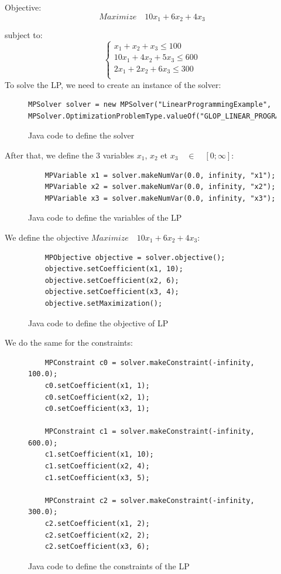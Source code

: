 \documentclass{report}
\begin{document}
Objective: 
\begin{equation}
Maximize \quad 10x_1 + 6x_2 + 4x_3
\end{equation}

subject to: \\
\begin{equation}
\begin{cases}
x_1 + x_2 + x_3 \leq 100\\
10x_1 + 4x_2 + 5x_3 \leq 600\\
2x_1 + 2x_2 + 6x_3 \leq 300\\
\end{cases}
\end{equation}
To solve the LP, we need to create an instance of the solver:
\begin{figure}[H]
\centering
\begin{lstlisting}
MPSolver solver = new MPSolver("LinearProgrammingExample", MPSolver.OptimizationProblemType.valueOf("GLOP_LINEAR_PROGRAMMING");
\end{lstlisting}
\caption{Java code to define the solver}
\end{figure}
After that, we define the 3 variables $x_1$, $x_2$ et $x_3 \quad \in \quad [0 ; \infty]$: \\
\begin{figure}[H]
\centering
\begin{lstlisting}
	MPVariable x1 = solver.makeNumVar(0.0, infinity, "x1");
	MPVariable x2 = solver.makeNumVar(0.0, infinity, "x2");
	MPVariable x3 = solver.makeNumVar(0.0, infinity, "x3");
\end{lstlisting}
\caption{Java code to define the variables of the LP}
\end{figure}
We define the objective $Maximize \quad 10x_1 + 6x_2 + 4x_3$: \\
\begin{figure}[H]
\centering
\begin{lstlisting}		
	MPObjective objective = solver.objective();
	objective.setCoefficient(x1, 10);
	objective.setCoefficient(x2, 6);
	objective.setCoefficient(x3, 4);
	objective.setMaximization();
\end{lstlisting}
\caption{Java code to define the objective of LP}
\end{figure}
\newpage
We do the same for the constraints: \\
\begin{figure}[H]
\centering
\begin{lstlisting}		
	MPConstraint c0 = solver.makeConstraint(-infinity, 100.0);
	c0.setCoefficient(x1, 1);
	c0.setCoefficient(x2, 1);
	c0.setCoefficient(x3, 1);

	MPConstraint c1 = solver.makeConstraint(-infinity, 600.0);
	c1.setCoefficient(x1, 10);
	c1.setCoefficient(x2, 4);
	c1.setCoefficient(x3, 5);
	
	MPConstraint c2 = solver.makeConstraint(-infinity, 300.0);
	c2.setCoefficient(x1, 2);
	c2.setCoefficient(x2, 2);
	c2.setCoefficient(x3, 6);
\end{lstlisting}
\caption{Java code to define the constraints of the LP}
\end{figure}
\end{document}
